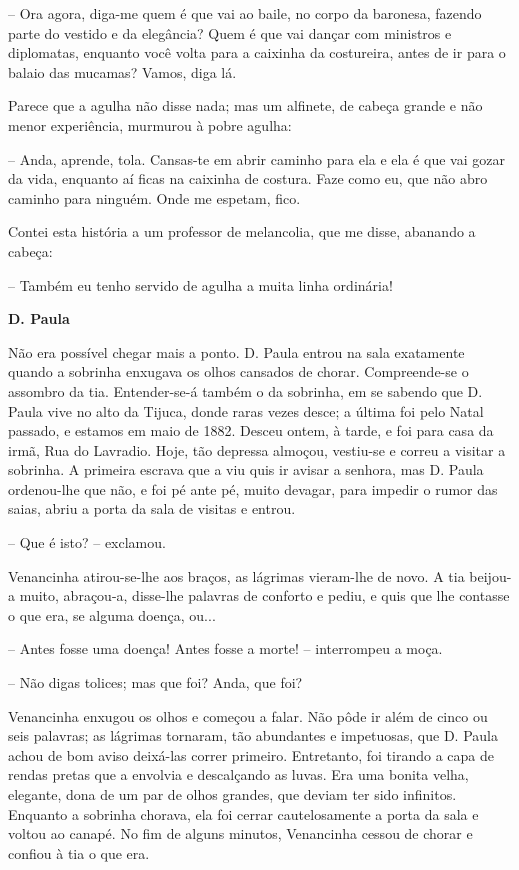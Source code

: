 -- Ora agora, diga-me quem é que vai ao baile, no corpo da baronesa,
fazendo parte do vestido e da elegância? Quem é que vai dançar com
ministros e diplomatas, enquanto você volta para a caixinha da
costureira, antes de ir para o balaio das mucamas? Vamos, diga lá.

Parece que a agulha não disse nada; mas um alfinete, de cabeça grande e
não menor experiência, murmurou à pobre agulha:

-- Anda, aprende, tola. Cansas-te em abrir caminho para ela e ela é que
vai gozar da vida, enquanto aí ficas na caixinha de costura. Faze como
eu, que não abro caminho para ninguém. Onde me espetam, fico.

Contei esta história a um professor de melancolia, que me disse,
abanando a cabeça:

-- Também eu tenho servido de agulha a muita linha ordinária!

\textbf{D. Paula}

Não era possível chegar mais a ponto. D. Paula entrou na sala exatamente
quando a sobrinha enxugava os olhos cansados de chorar. Compreende-se o
assombro da tia. Entender-se-á também o da sobrinha, em se sabendo que
D. Paula vive no alto da Tijuca, donde raras vezes desce; a última foi
pelo Natal passado, e estamos em maio de 1882. Desceu ontem, à tarde, e
foi para casa da irmã, Rua do Lavradio. Hoje, tão depressa almoçou,
vestiu-se e correu a visitar a sobrinha. A primeira escrava que a viu
quis ir avisar a senhora, mas D. Paula ordenou-lhe que não, e foi pé
ante pé, muito devagar, para impedir o rumor das saias, abriu a porta da
sala de visitas e entrou.

-- Que é isto? -- exclamou.

Venancinha atirou-se-lhe aos braços, as lágrimas vieram-lhe de novo. A
tia beijou-a muito, abraçou-a, disse-lhe palavras de conforto e pediu, e
quis que lhe contasse o que era, se alguma doença, ou...

-- Antes fosse uma doença! Antes fosse a morte! -- interrompeu a moça.

-- Não digas tolices; mas que foi? Anda, que foi?

Venancinha enxugou os olhos e começou a falar. Não pôde ir além de cinco
ou seis palavras; as lágrimas tornaram, tão abundantes e impetuosas, que
D. Paula achou de bom aviso deixá-las correr primeiro. Entretanto, foi
tirando a capa de rendas pretas que a envolvia e descalçando as luvas.
Era uma bonita velha, elegante, dona de um par de olhos grandes, que
deviam ter sido infinitos. Enquanto a sobrinha chorava, ela foi cerrar
cautelosamente a porta da sala e voltou ao canapé. No fim de alguns
minutos, Venancinha cessou de chorar e confiou à tia o que era.

